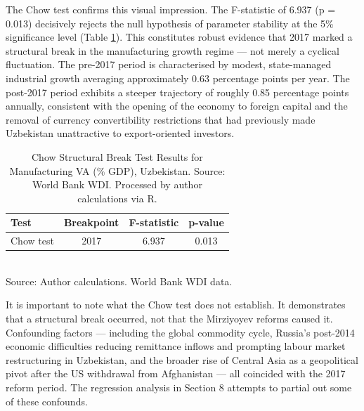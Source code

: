\documentclass[14pt,a4paper]{extarticle}
\begin{document}
The Chow test confirms this visual impression. The F-statistic of 6.937 (p = 0.013) decisively rejects the null hypothesis of parameter stability at the 5\% significance level (Table \ref{tab:chow}). This constitutes robust evidence that 2017 marked a structural break in the manufacturing growth regime --- not merely a cyclical fluctuation. The pre-2017 period is characterised by modest, state-managed industrial growth averaging approximately 0.63 percentage points per year. The post-2017 period exhibits a steeper trajectory of roughly 0.85 percentage points annually, consistent with the opening of the economy to foreign capital and the removal of currency convertibility restrictions that had previously made Uzbekistan unattractive to export-oriented investors.

\begin{table}[H]
  \centering
  \caption{Chow Structural Break Test Results for Manufacturing VA (\% GDP), Uzbekistan. Source: World Bank WDI. Processed by author calculations via R.}
  \label{tab:chow}
  \begin{tabular}{lccc}
    \toprule
    Test & Breakpoint & F-statistic & p-value \\
    \midrule
    Chow test & 2017 & 6.937 & 0.013 \\
    \bottomrule
  \end{tabular}
  \\
  \small Source: Author calculations. World Bank WDI data.
\end{table}

It is important to note what the Chow test does not establish. It demonstrates that a structural break occurred, not that the Mirziyoyev reforms caused it. Confounding factors --- including the global commodity cycle, Russia's post-2014 economic difficulties reducing remittance inflows and prompting labour market restructuring in Uzbekistan, and the broader rise of Central Asia as a geopolitical pivot after the US withdrawal from Afghanistan --- all coincided with the 2017 reform period. The regression analysis in Section 8 attempts to partial out some of these confounds.
\end{document}
